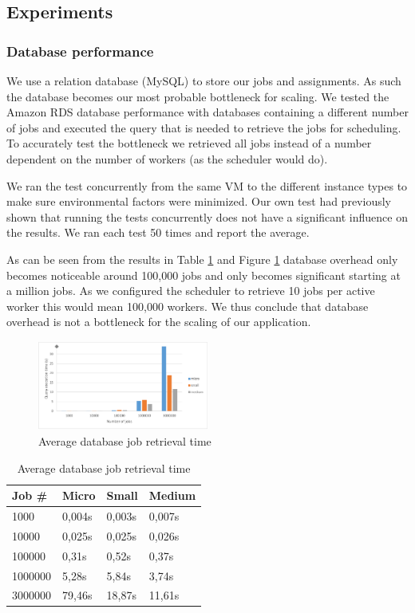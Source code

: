 \documentclass[a4paper]{IEEEtran}
\begin{document}
\subsection{Experiments}

\subsubsection{Database performance}

We use a relation database (MySQL) to store our jobs and assignments. As such the database becomes our most probable bottleneck for scaling. We tested the Amazon RDS database performance with databases containing a different number of jobs and executed the query that is needed to retrieve the jobs for scheduling. To accurately test the bottleneck we retrieved all jobs instead of a number dependent on the number of workers (as the scheduler would do).

We ran the test concurrently from the same VM to the different instance types to make sure environmental factors were minimized. Our own test had previously shown that running the tests concurrently does not have a significant influence on the results. We ran each test 50 times and report the average.

As can be seen from the results in Table \ref{dbperfresults} and Figure \ref{fig_dbperfresults} database overhead only becomes noticeable around 100,000 jobs and only becomes significant starting at a million jobs. As we configured the scheduler to retrieve 10 jobs per active worker this would mean 100,000 workers. We thus conclude that database overhead is not a bottleneck for the scaling of our application.

\begin{figure}
\centering
\includegraphics[width=0.5\textwidth]{"results-database"}
\caption{Average database job retrieval time}
\label{fig_dbperfresults}
\end{figure}

\begin{table}
\centering

\begin{tabular}{| l | l | l | l |}
\hline
Job \# & Micro & Small & Medium \\ \hline
1000 & 0,004s &	0,003s & 0,007s \\ \hline
10000 & 0,025s & 0,025s & 0,026s \\ \hline
100000 & 0,31s & 0,52s & 0,37s \\ \hline
1000000 & 5,28s & 5,84s & 3,74s \\ \hline
3000000	& 79,46s & 18,87s & 11,61s \\ \hline
\end{tabular}

\caption{Average database job retrieval time}
\label{dbperfresults}
\end{table}
\end{document}
